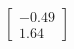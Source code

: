 \documentclass[preview]{standalone}
\begin{document}
\begin{align*}
\begin{bmatrix} -0.49 \\ 1.64 \end{bmatrix}
\end{align*}
\end{document}
